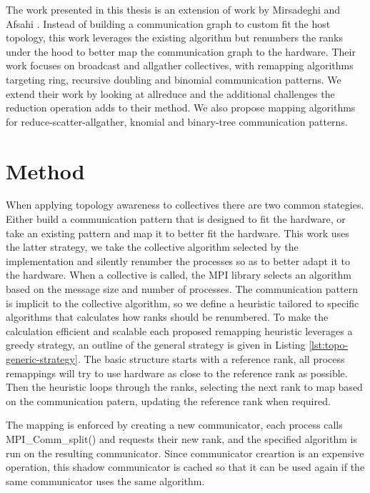 The work presented in this thesis is an extension of work by Mirsadeghi and Afsahi \cite{Mirsadeghi2016TopoAwareCollRR}.
Instead of building a communication graph to custom fit the host topology, this work leverages the existing algorithm but renumbers the ranks under the hood to better map the communication graph to the hardware.
Their work focuses on broadcast and allgather collectives, with remapping algorithms targeting ring, recursive doubling and binomial communication patterns.
We extend their work by looking at allreduce and the additional challenges the reduction operation adds to their method.
We also propose mapping algorithms for reduce-scatter-allgather, knomial and binary-tree communication patterns.


\section{Method}

\lstset{style = bklstc}
\lstset{label = lst:topo-generic-strategy}
\lstset{caption = General greedy heuristic for topology-aware rank reordering.}


When applying topology awareness to collectives there are two common stategies.
Either build a communication pattern that is designed to fit the hardware, or take an existing pattern and map it to better fit the hardware.
This work uses the latter strategy, we take the collective algorithm selected by the implementation and silently renumber the processes so as to better adapt it to the hardware.
When a collective is called, the MPI library selects an algorithm based on the message size and number of processes.
The communication pattern is implicit to the collective algorithm, so we define a heuristic tailored to specific algorithms that calculates how ranks should be renumbered.
To make the calculation efficient and scalable each proposed remapping heuristic leverages a greedy strategy, an outline of the general strategy is given in Listing \ref{lst:topo-generic-strategy}.
The basic structure starts with a reference rank, all process remappings will try to use hardware as close to the reference rank as possible.
Then the heuristic loops through the ranks, selecting the next rank to map based on the communication patern, updating the reference rank when required.

The mapping is enforced by creating a new communicator, each process calls MPI\_Comm\_split() and requests their new rank, and the specified algorithm is run on the resulting communicator.
Since communicator creartion is an expensive operation, this shadow communicator is cached so that it can be used again if the same communicator uses the same algorithm.

